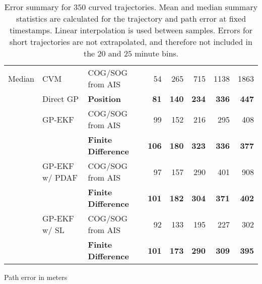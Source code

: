 \begin{table}
\begin{subtable}{\textwidth}
{\begin{tabular}{lllrrrrr}
                \hline
                Median  & CVM            & COG/SOG from AIS       & 54       & 265      & 715     & 1138    & 1863     \\
                        & Direct GP      & \bf Position           & \bf 81   & \bf 140  & \bf 234 & \bf 336 & \bf 447  \\
                        & GP-EKF         & COG/SOG from AIS       & 99       & 152      & 216     & 295     & 408      \\
                        &                & \bf Finite Difference  & \bf 106  & \bf 180  & \bf 323 & \bf 336 & \bf  377 \\
                        & GP-EKF w/ PDAF & COG/SOG from AIS       & 97       & 157      & 290     & 401     & 908      \\
                        &                & \bf  Finite Difference & \bf  101 & \bf  182 & \bf 304 & \bf 371 & \bf 402  \\
                        & GP-EKF w/ SL   & COG/SOG from AIS       & 92       & 133      & 195     & 227     & 302      \\
                        &                & \bf  Finite Difference & \bf 101  & \bf 173  & \bf 290 & \bf 309 & \bf 395  \\
                \bottomrule
            \end{tabular}
        }
        \caption{Path error in meters}
        \label{table:stats_curved_path_err}
    \end{subtable}
    \caption{Error summary for $350$ curved trajectories. Mean and median summary statistics are calculated for the trajectory and path error at fixed timestamps. Linear interpolation is used between samples. Errors for short trajectories are not extrapolated, and therefore not included in the $20$ and $25$ minute bins.}
    \label{table:stats_curved_error}
\end{table}